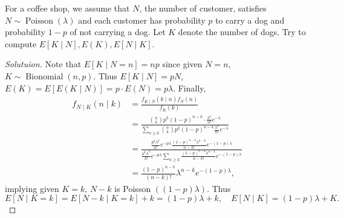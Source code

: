 \documentclass[11pt,singlecolumn, openany, citestyle=authoryear]{elegantbook}
\begin{document}
\begin{CJK}{UTF8}{gbsn}
\begin{example}
    For a coffee shop, we assume that $N$, the number of customer, satisfies 
    $N\sim \operatorname{Poisson}(\lambda)$ and each customer has probability $p$
    to carry a dog and probability $1-p$ of not carrying a dog. Let $K$ denote the 
    number of dogs. Try to compute $E[K\mid N], E(K), E[N\mid K]$.
\end{example}
\begin{proof}[Solutuion]
    Note that $E[K\mid N=n] = np$
    since given $N=n$, $K\sim \operatorname{Bionomial}(n,p)$.
    Thus $E[K\mid N]=pN$, 
    $E(K)=E[E(K\mid N)]=p \cdot E(N)= p\lambda$. Finally,
    \begin{align*}
        f_{N\mid K}(n\mid k) &= \frac{f_{K\mid N}(k\mid n)f_N(n)}{f_K(k)}\\
        &= \frac{\binom{n}{k} p^k(1-p)^{n-k} \cdot \frac{\lambda^n}{n!}e^{-\lambda}}
        {\sum_{n\geqslant k}\binom{n}{k}p^k(1-p)^{n-k}\frac{\lambda^n}{n!}e^{-\lambda}}\\
        &=\frac{
            \frac{p^k \lambda^k}{k!} e^{-p\lambda}
            \frac{(1-p)^{n-k} \lambda^{n-k}}{{n-k}!} e^{-(1-p)\lambda}  
        }{\frac{p^k \lambda^k}{k!} e^{-p\lambda}\sum_{n\geqslant k}
        \frac{(1-p)^{n-k} \lambda^{n-k}}{{n-k}!} e^{-(1-p)\lambda}}\\
        &= \frac{(1-p)^{n-k}}{(n-k)!} \lambda^{n-k} e^{-(1-p)\lambda},
    \end{align*}
    implying given $K=k$, $N-k$ is Poisson $((1-p)\lambda)$. Thus 
    $$
    E[N\mid K=k]=E[N-k\mid K=k]+k = (1-p)\lambda + k, \quad 
    E[N\mid K]=(1-p)\lambda + K.
    $$
\end{proof}


\end{CJK}
\end{document}
